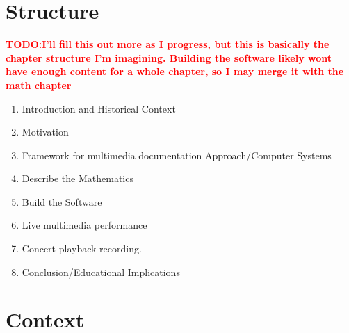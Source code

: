 \documentclass{tufte-book}
\newcommand{\TODO}[1]{\textcolor{red}{\bf TODO:#1}\xspace}
\begin{document}
\section{Structure}
\label{sec:structure}
\TODO{I'll fill this out more as I progress, but this is basically the
  chapter structure I'm imagining. Building the software likely wont
  have enough content for a whole chapter, so I may merge it with the
  math chapter}
\begin{enumerate}
\item Introduction and  Historical Context %
\item Motivation
\item Framework for multimedia documentation Approach/Computer Systems
\item Describe the Mathematics 
\item Build the Software
\item Live multimedia performance
\item Concert playback recording. 
\item Conclusion/Educational Implications
\end{enumerate}

\section{Context}
\label{sec:context}
\end{document}
